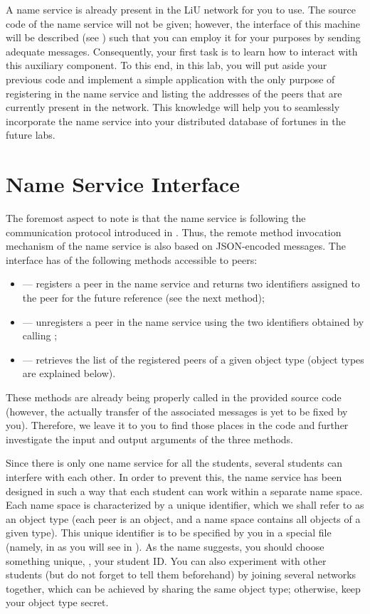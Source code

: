 \documentclass[a4paper]{article}
\begin{document}
A name service is already present in the LiU network for you to use. The source
code of the name service will not be given; however, the interface of this
machine will be described (see ) such that you can employ it for
your purposes by sending adequate messages. Consequently, your first task is to
learn how to interact with this auxiliary component. To this end, in this lab,
you will put aside your previous code and implement a simple application with
the only purpose of registering in the name service and listing the addresses of
the peers that are currently present in the network. This knowledge will help
you to seamlessly incorporate the name service into your distributed database of
fortunes in the future labs.

\section{Name Service Interface} 
The foremost aspect to note is that the name service is following the
communication protocol introduced in . Thus, the remote method
invocation mechanism of the name service is also based on JSON-encoded messages.
The interface has of the following methods accessible to peers:
\begin{itemize}

  \item {} --- registers a peer in the name service and returns two
  identifiers assigned to the peer for the future reference (see the next
  method);

  \item {} --- unregisters a peer in the name service using the
  two identifiers obtained by calling ;

  \item {} --- retrieves the list of the registered peers of a
  given object type (object types are explained below).

\end{itemize}
These methods are already being properly called in the provided source code
(however, the actually transfer of the associated messages is yet to be fixed by
you). Therefore, we leave it to you to find those places in the code and further
investigate the input and output arguments of the three methods.

Since there is only one name service for all the students, several students can
interfere with each other. In order to prevent this, the name service has been
designed in such a way that each student can work within a separate name space.
Each name space is characterized by a unique identifier, which we shall refer to
as an object type (each peer is an object, and a name space contains all objects
of a given type). This unique identifier is to be specified by you in a special
file (namely, in  as you will see in ). As
the name suggests, you should choose something unique, \eg, your student ID. You
can also experiment with other students (but do not forget to tell them
beforehand) by joining several networks together, which can be achieved by
sharing the same object type; otherwise, keep your object type secret.
\end{document}
